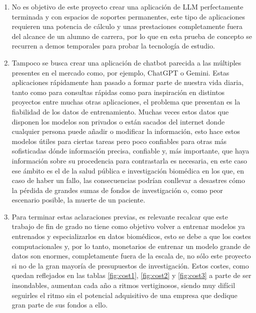 \begin{enumerate}

    \item No es objetivo de este proyecto crear una aplicación de LLM perfectamente terminada y con espacios de soportes permanentes, este tipo de aplicaciones requieren una potencia de cálculo y unas prestaciones completamente fuera del alcance de un alumno de carrera, por lo que en esta prueba de concepto se recurren a demos temporales para probar la tecnología de estudio.
    
    \item Tampoco se busca crear una aplicación de chatbot parecida a las múltiples presentes en el mercado como, por ejemplo, ChatGPT o Gemini. Estas aplicaciones rápidamente han pasado a formar parte de nuestra vida diaria, tanto como para consultas rápidas como para inspiración en distintos proyectos entre muchas otras aplicaciones, el problema que presentan es la fiabilidad de los datos de entrenamiento. Muchas veces estos datos que disponen los modelos son privados o están sacados del internet donde cualquier persona puede añadir o modificar la información, esto hace estos modelos útiles para ciertas tareas pero poco confiables para otras más sofisticadas dónde información precisa, confiable y, más importante, que haya información sobre su procedencia para contrastarla es necesaria, en este caso ese ámbito es el de la salud pública e investigación biomédica en los que, en caso de haber un fallo, las consecuencias podrían conllevar a desastres cómo la pérdida de grandes sumas de fondos de investigación o, como peor escenario posible, la muerte de un paciente.
    
    \item Para terminar estas aclaraciones previas, es relevante recalcar que este trabajo de fin de grado no tiene como objetivo volver a entrenar modelos ya entrenados y especializarlos en datos biomédicos, esto se debe a que los costes computacionales y, por lo tanto, monetarios de entrenar un modelo grande de datos son enormes, completamente fuera de la escala de, no sólo este proyecto si no de la gran mayoría de presupuestos de investigación. Estos costes, como quedan reflejados en las tablas \ref{fig:cost1}, \ref{fig:cost2} y \ref{fig:cost3} a parte de ser insondables, aumentan cada año a ritmos vertiginosos, siendo muy difícil seguirles el ritmo sin el potencial adquisitivo de una empresa que dedique gran parte de sus fondos a ello.
    
\end{enumerate}

